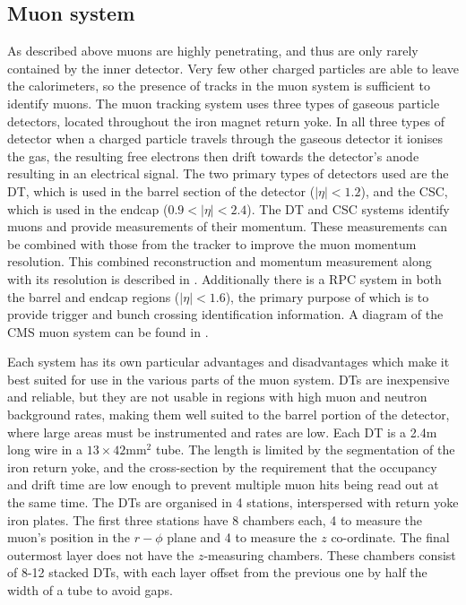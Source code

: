 \subsection{Muon system}
As described above muons are highly penetrating, and thus are only rarely contained by the inner detector. Very few other charged particles are able to leave the calorimeters, so the presence of tracks in the muon system is sufficient to identify muons. The muon tracking system uses three types of gaseous particle detectors, located throughout the iron magnet return yoke. In all three types of detector when a charged particle travels through the gaseous detector it ionises the gas, the resulting free electrons then drift towards the detector's anode resulting in an electrical signal. The two primary types of detectors used are the \ac{DT}, which is used in the barrel section of the detector ($|\eta|<1.2$), and the \ac{CSC}, which is used in the endcap ($0.9<|\eta|<2.4$). The \ac{DT} and \ac{CSC} systems identify muons and provide measurements of their momentum. These measurements can be combined with those from the tracker to improve the muon momentum resolution. This combined reconstruction and momentum measurement along with its resolution is described in . Additionally there is a \ac{RPC} system in both the barrel and endcap regions ($|\eta|<1.6$), the primary purpose of which is to provide trigger and bunch crossing identification information. A diagram of the CMS muon system can be found in .

Each system has its own particular advantages and disadvantages which make it best suited for use in the various parts of the muon system. \ac{DT}s are inexpensive and reliable, but they are not usable in regions with high muon and neutron background rates, making them well suited to the barrel portion of the detector, where large areas must be instrumented and rates are low. Each \ac{DT} is a 2.4m long wire in a $13\times 42$mm$^{2}$ tube. The length is limited by the segmentation of the iron return yoke, and the cross-section by the requirement that the occupancy and drift time are low enough to prevent multiple muon hits being read out at the same time. The \ac{DT}s are organised in 4 stations, interspersed with return yoke iron plates. The first three stations have 8 chambers each, 4 to measure the muon's position in the $r-\phi$ plane and 4 to measure the $z$ co-ordinate. The final outermost layer does not have the $z$-measuring chambers. These chambers consist of 8-12 stacked \ac{DT}s, with each layer offset from the previous one by half the width of a tube to avoid gaps.

